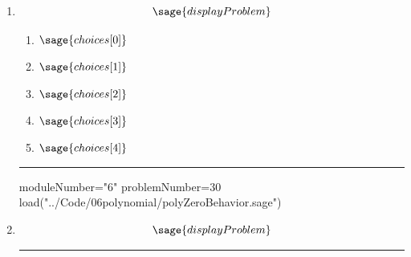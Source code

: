 \documentclass[14pt]{extbook}
\newcommand{\litem}[1]{\item#1\hspace*{-1cm}\rule{\textwidth}{0.4pt}}
\begin{document}
\begin{enumerate}
\litem{ 

   \[ \sage{displayProblem} \]

  	\begin{enumerate}[label=\Alph*.]
    \item \( \sage{choices[0]} \)
    \item \( \sage{choices[1]} \)
    \item \( \sage{choices[2]} \)
    \item \( \sage{choices[3]} \)
    \item \( \sage{choices[4]} \)
  	\end{enumerate}
  }

\begin{sagesilent}
moduleNumber="6"
problemNumber=30
load("../Code/06polynomial/polyZeroBehavior.sage")
\end{sagesilent}

\litem{ 

\[ \sage{displayProblem} \]

}
\end{enumerate}
\end{document}
